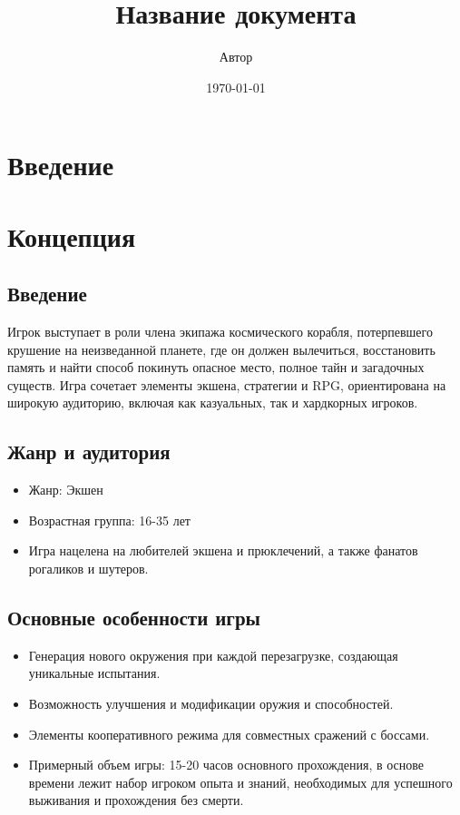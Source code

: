 \documentclass[a4paper,12pt]{article}
\title{Название документа}
\author{Автор}
\date{\today}
\begin{document}
\maketitle

\tableofcontents %
\newpage
\section{Введение}
\newpage

\section{Концепция}
\subsection{Введение}

Игрок выступает в роли члена экипажа космического корабля, потерпевшего крушение на неизведанной планете, где он должен вылечиться, восстановить память и найти способ покинуть опасное место, полное тайн и загадочных существ. Игра сочетает элементы экшена, стратегии и RPG, ориентирована на широкую аудиторию, включая как казуальных, так и хардкорных игроков.
\subsection{Жанр и аудитория}
\begin{itemize}
    \item Жанр: Экшен
    \item Возрастная группа: 16-35 лет
    \item Игра нацелена на любителей экшена и прюклечений, а также фанатов рогаликов и шутеров.
\end{itemize}
\subsection{Основные особенности игры}
\begin{itemize}
    \item Генерация нового окружения при каждой перезагрузке, создающая уникальные испытания.
    \item Возможность улучшения и модификации оружия и способностей.
    \item Элементы кооперативного режима для совместных сражений с боссами.
    \item Примерный объем игры: 15-20 часов основного прохождения, в основе времени лежит набор игроком опыта и знаний, необходимых для успешного выживания и прохождения без смерти.
\end{itemize}
\end{document}
